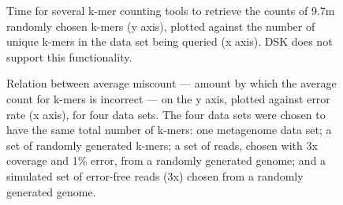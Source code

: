 \documentclass{article}
\begin{document}
\begin{figure}
\caption{Time for several k-mer counting tools to retrieve the counts of 9.7m randomly chosen k-mers (y axis), plotted against the number of unique k-mers in the data set being queried (x axis).  DSK does not support this functionality.}
\label{cmp_count}
\end{figure}

\begin{figure}
\caption{Relation between average miscount --- amount by which
the average count for k-mers is incorrect --- on the y axis, plotted against
error rate (x axis), for four data sets.  The four data
sets were chosen to have the same total number of k-mers: one
metagenome data set; a set of randomly generated k-mers; a set
of reads, chosen with 3x coverage and 1\% error, from a randomly generated
genome; and a simulated set of error-free reads (3x) chosen from a randomly
generated genome.}
\label{average_offset_vs_fpr}
\end{figure}
\end{document}
